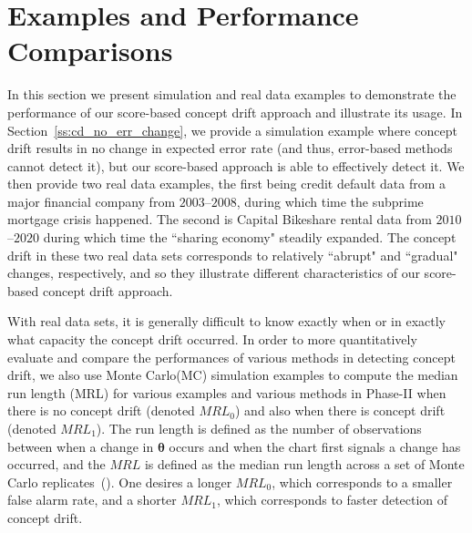 \documentclass[twoside,11pt]{article}
\begin{document}
\section{Examples and Performance Comparisons}
\label{s:real_data}
In this section we present simulation and real data examples to demonstrate the performance of our score-based concept drift approach and illustrate its usage. In Section~\ref{ss:cd_no_err_change}, we provide a simulation example where concept drift results in no change in expected error rate (and thus, error-based methods cannot detect it), but our score-based approach is able to effectively detect it. We then provide two real data examples, the first being credit default data from a major financial company from $2003$--$2008$, during which time the subprime mortgage crisis happened. The second is Capital Bikeshare rental data from $2010$--$2020$ during which time the ``sharing economy" steadily expanded. The concept drift in these two real data sets corresponds to relatively ``abrupt" and ``gradual" changes, respectively, and so they illustrate different characteristics of our score-based concept drift approach. 

With real data sets, it is generally difficult to know exactly when or in exactly what capacity the concept drift occurred. In order to more quantitatively evaluate and compare the performances of various methods in detecting concept drift, we also use Monte Carlo(MC) simulation examples to compute the median run length (MRL) for various examples and various methods in Phase-II when there is no concept drift (denoted $MRL_0$) and also when there is concept drift (denoted $MRL_1$). The run length is defined as the number of observations between when a change in $\bm{\theta}$ occurs and when the chart first signals a change has occurred, and the $MRL$ is defined as the median run length across a set of Monte Carlo replicates~(\cite{montgomery2007introduction}). One desires a longer $MRL_0$, which corresponds to a smaller false alarm rate, and a shorter $MRL_1$, which corresponds to faster detection of concept drift. 
\end{document}
